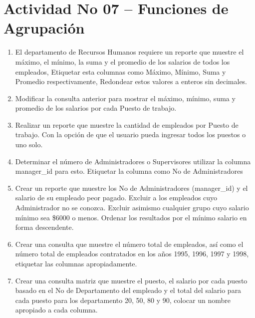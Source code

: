 \section{Actividad No 07 – Funciones de Agrupaci\'on} 
		
\begin{enumerate}[1.]
	\item El departamento de Recursos Humanos requiere un reporte que muestre el máximo, el mínimo, la suma y el promedio de los salarios de todos los empleados, Etiquetar esta columnas como Máximo, Mínimo, Suma y Promedio respectivamente, Redondear estos valores a enteros sin decimales.
	\\

	\item Modificar la consulta anterior para mostrar el máximo, mínimo, suma y promedio de los salarios por cada Puesto de trabajo. 
	\item Realizar un reporte que muestre la cantidad de empleados por Puesto de trabajo. Con la opción de que el usuario pueda ingresar todos los puestos o uno solo.
	\\	

	\item Determinar el n\'umero de Administradores o Supervisores utilizar la columna manager\_id para esto. Etiquetar la columna como No de Administradores
	\\	

	\item Crear un reporte que muestre los No de Administradores (manager\_id) y el salario de su empleado peor pagado. Excluir a los empleados cuyo Administrador no se conozca. Excluir asimismo cualquier grupo cuyo salario mínimo sea \$6000 o menos. Ordenar los resultados por el mínimo salario en forma descendente.
	\\

	\item Crear una consulta que muestre el número total de empleados, así como el número total de empleados contratados en los años 1995, 1996, 1997 y 1998, etiquetar las columnas apropiadamente.
	\item Crear una consulta matriz que muestre el puesto, el salario por cada puesto basado en el No de Departamento del empleado y el total del salario para cada puesto para los departamento 20, 50, 80 y 90, colocar un nombre apropiado a cada columna.
\end{enumerate}
